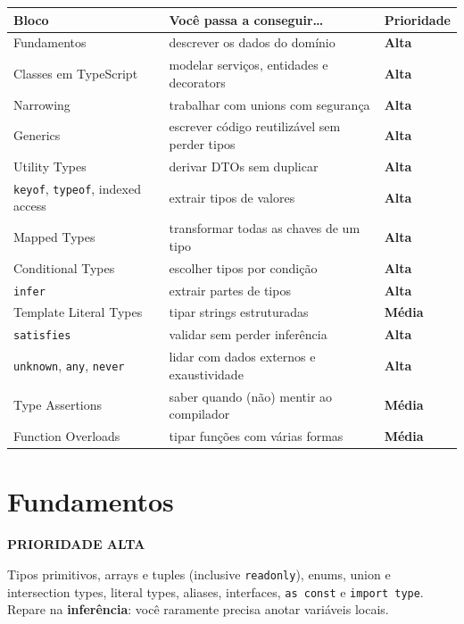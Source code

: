 \documentclass[12pt,a4paper,oneside]{book}
\newcommand{\alta}{\colorbox{red!15}{\sffamily\scriptsize\bfseries PRIORIDADE ALTA}}
\newcommand{\Ta}{\textcolor{red!70!black}{\sffamily\bfseries Alta}}
\newcommand{\Tm}{\textcolor{orange!80!black}{\sffamily\bfseries Média}}
\newcommand{\code}[1]{\texttt{#1}}
\begin{document}
{\small
\begin{tabularx}{\textwidth}{@{}lXl@{}}
\toprule
\textbf{Bloco} & \textbf{Você passa a conseguir\ldots} & \textbf{Prioridade} \\
\midrule
Fundamentos & descrever os dados do domínio & \Ta \\
Classes em TypeScript & modelar serviços, entidades e decorators & \Ta \\
Narrowing & trabalhar com unions com segurança & \Ta \\
Generics & escrever código reutilizável sem perder tipos & \Ta \\
Utility Types & derivar DTOs sem duplicar & \Ta \\
\code{keyof}, \code{typeof}, indexed access & extrair tipos de valores & \Ta \\
Mapped Types & transformar todas as chaves de um tipo & \Ta \\
Conditional Types & escolher tipos por condição & \Ta \\
\code{infer} & extrair partes de tipos & \Ta \\
Template Literal Types & tipar strings estruturadas & \Tm \\
\code{satisfies} & validar sem perder inferência & \Ta \\
\code{unknown}, \code{any}, \code{never} & lidar com dados externos e exaustividade & \Ta \\
Type Assertions & saber quando (não) mentir ao compilador & \Tm \\
Function Overloads & tipar funções com várias formas & \Tm \\
\bottomrule
\end{tabularx}
}

\section{Fundamentos}
\label{sec:tsfund}
\alta

Tipos primitivos, arrays e tuples (inclusive \code{readonly}), enums, union e intersection types, literal types, aliases, interfaces, \code{as const} e \code{import type}. Repare na \textbf{inferência}: você raramente precisa anotar variáveis locais.
\end{document}
